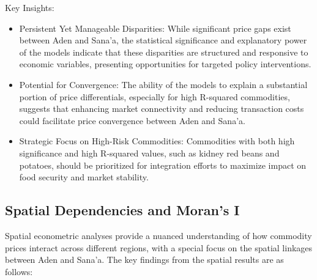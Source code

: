 Key Insights:
\begin{itemize}
\item Persistent Yet Manageable Disparities: While significant price gaps exist between Aden and Sana'a, the statistical significance and explanatory power of the models indicate that these disparities are structured and responsive to economic variables, presenting opportunities for targeted policy interventions.

\item Potential for Convergence: The ability of the models to explain a substantial portion of price differentials, especially for high R-squared commodities, suggests that enhancing market connectivity and reducing transaction costs could facilitate price convergence between Aden and Sana'a.

\item Strategic Focus on High-Risk Commodities: Commodities with both high significance and high R-squared values, such as kidney red beans and potatoes, should be prioritized for integration efforts to maximize impact on food security and market stability.
\end{itemize}

\subsection{Spatial Dependencies and Moran's I}

Spatial econometric analyses provide a nuanced understanding of how commodity prices interact across different regions, with a special focus on the spatial linkages between Aden and Sana'a. The key findings from the spatial results are as follows:

